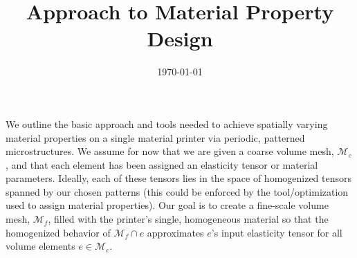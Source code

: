 \documentclass[10pt]{article}
\title{Approach to Material Property Design}
\author{}
\date{\vspace{-24pt} \today}
\providecommand{\mesh}{\mathcal{M}}
\begin{document}
\maketitle
We outline the basic approach and tools needed to achieve spatially varying
material properties on a single material printer via periodic, patterned
microstructures. We assume for now that we are given a coarse volume mesh,
$\mesh_c$, and that each element has been assigned an elasticity tensor or
material parameters. Ideally, each of these tensors lies in the space of
homogenized tensors spanned by our chosen patterns (this could be enforced by
the tool/optimization used to assign material properties). Our goal is to create
a fine-scale volume mesh, $\mesh_f$, filled with the printer's single,
homogeneous material so that the homogenized behavior of $\mesh_f \cap e$
approximates $e$'s input elasticity tensor for all volume elements $e \in
\mesh_c$.
\end{document}
